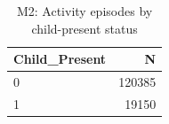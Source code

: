 \begin{table}[ht]
\centering
\begin{tabular}{lr}
  \toprule
Child\_Present & N \\ 
  \midrule
0 & 120385 \\ 
  1 & 19150 \\ 
   \bottomrule
\end{tabular}
\caption{M2: Activity episodes by child-present status} 
\label{tab:m2_summary}
\end{table}
